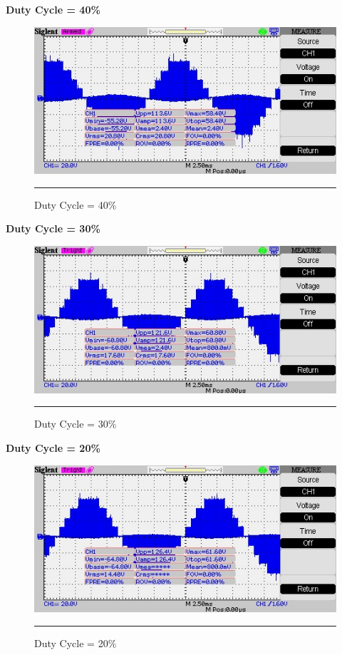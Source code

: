 \newpage
\textbf{Duty Cycle = 40\%}
\begin{figure}[htbp]
	\centering
	\includegraphics[width = 6in]{./Figures/Photos/Hardware/39}
	\rule{35em}{1pt}
	\caption{Duty Cycle = 40\%}
\end{figure}


\textbf{Duty Cycle = 30\%}
\begin{figure}[htbp]
	\centering
	\includegraphics[width = 6in]{./Figures/Photos/Hardware/40}
	\rule{35em}{1pt}
	\caption{Duty Cycle = 30\%}
\end{figure}

\newpage
\textbf{Duty Cycle = 20\%}
\begin{figure}[htbp]
	\centering
	\includegraphics[width = 6in]{./Figures/Photos/Hardware/41}
	\rule{35em}{1pt}
	\caption{Duty Cycle = 20\%}
\end{figure}


